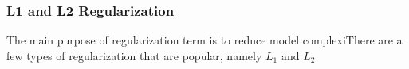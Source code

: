 \subsubsection{L1 and L2 Regularization}

The main purpose of regularization term is to reduce model complexiThere are a few types of regularization that are popular, namely $L_1$ and $L_2$